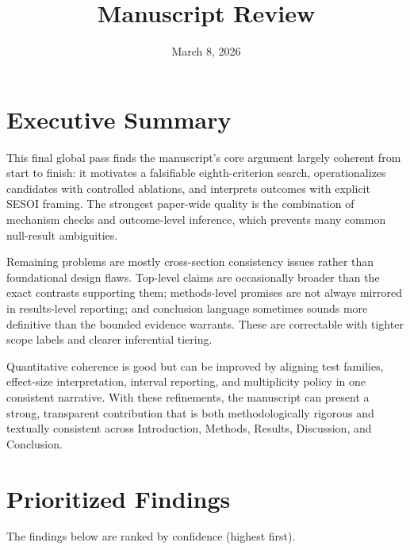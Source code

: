 \documentclass[11pt]{article}
\begin{document}
\title{Manuscript Review}
\author{}
\date{March 8, 2026}
\maketitle

\section{Executive Summary}
This final global pass finds the manuscript's core argument largely coherent from start to finish: it motivates a falsifiable eighth-criterion search, operationalizes candidates with controlled ablations, and interprets outcomes with explicit SESOI framing. The strongest paper-wide quality is the combination of mechanism checks and outcome-level inference, which prevents many common null-result ambiguities.

Remaining problems are mostly cross-section consistency issues rather than foundational design flaws. Top-level claims are occasionally broader than the exact contrasts supporting them; methods-level promises are not always mirrored in results-level reporting; and conclusion language sometimes sounds more definitive than the bounded evidence warrants. These are correctable with tighter scope labels and clearer inferential tiering.

Quantitative coherence is good but can be improved by aligning test families, effect-size interpretation, interval reporting, and multiplicity policy in one consistent narrative. With these refinements, the manuscript can present a strong, transparent contribution that is both methodologically rigorous and textually consistent across Introduction, Methods, Results, Discussion, and Conclusion.

\section{Prioritized Findings}
The findings below are ranked by confidence (highest first).
\end{document}
